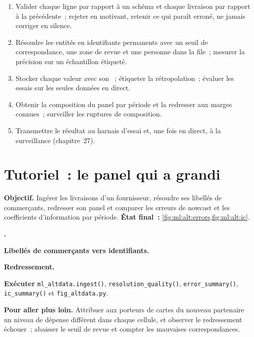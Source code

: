 \begin{method}\label{met:ml:alt:method}
\begin{enumerate}
\item Valider chaque ligne par rapport à un schéma et chaque livraison par rapport à la précédente~; rejeter en motivant, retenir ce qui paraît erroné,
ne jamais corriger en silence.
\item Résoudre les entités en identifiants permanents avec un seuil de correspondance, une zone de revue et une personne dans la file~; mesurer
la précision sur un échantillon étiqueté.
\item Stocker chaque valeur avec son ~; étiqueter la rétropolation~; évaluer les essais sur les seules données en direct.
\item Obtenir la composition du panel par période et la redresser aux marges connues~; surveiller les ruptures de composition.
\item Transmettre le résultat au harnais d'essai et, une fois en direct, à la surveillance (chapitre~27).
\end{enumerate}
\end{method}

\section{Tutoriel~: le panel qui a grandi}\label{tut:ml:alternative-data-pipelines:tut}

\begin{tutorial}
\textbf{Objectif.} Ingérer les livraisons d'un fournisseur, résoudre ses libellés de commerçants, redresser son panel et comparer les erreurs de nowcast et les coefficients d'information
par période. \textbf{État final~:} \cref{fig:ml:alt:errors,fig:ml:alt:ic}.
\begin{tutsteps}
\item \textbf{.}
\label{lst:ml:alt:validate}
\item \textbf{Libellés de commerçants vers identifiants.}
\label{lst:ml:alt:resolve}
\item \textbf{Redressement.}
\label{lst:ml:alt:rake}
\item \textbf{Exécuter} \texttt{ml\_altdata.ingest()}, \texttt{resolution\_quality()}, \texttt{error\_summary()},
\texttt{ic\_summary()} et \texttt{fig\_altdata.py}.
\end{tutsteps}
\textbf{Pour aller plus loin.} Attribuer aux porteurs de cartes du nouveau partenaire un niveau de dépense différent dans chaque cellule, et observer
le redressement échouer~; abaisser le seuil de revue et compter les mauvaises correspondances.
\end{tutorial}

